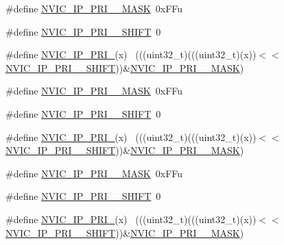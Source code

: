 \begin{DoxyCompactItemize}
\item 
\#define \hyperlink{group___n_v_i_c___register___masks_gad9d53a724bb3444439b236ad42d98266}{N\+V\+I\+C\+\_\+\+I\+P\+\_\+\+P\+R\+I\+\_\+\_\+\+M\+A\+SK}~0x\+F\+Fu
\item 
\#define \hyperlink{group___n_v_i_c___register___masks_ga06c5d2803f46b7145c7369ad34ce864b}{N\+V\+I\+C\+\_\+\+I\+P\+\_\+\+P\+R\+I\+\_\+\_\+\+S\+H\+I\+FT}~0
\item 
\#define \hyperlink{group___n_v_i_c___register___masks_ga2b7f135f6f5ab3e8557131145b390786}{N\+V\+I\+C\+\_\+\+I\+P\+\_\+\+P\+R\+I\+\_}(x)                                              ~(((uint32\+\_\+t)(((uint32\+\_\+t)(x))$<$$<$\hyperlink{group___n_v_i_c___register___masks_ga06c5d2803f46b7145c7369ad34ce864b}{N\+V\+I\+C\+\_\+\+I\+P\+\_\+\+P\+R\+I\+\_\+\_\+\+S\+H\+I\+FT}))\&\hyperlink{group___n_v_i_c___register___masks_gad9d53a724bb3444439b236ad42d98266}{N\+V\+I\+C\+\_\+\+I\+P\+\_\+\+P\+R\+I\+\_\+\_\+\+M\+A\+SK})
\item 
\#define \hyperlink{group___n_v_i_c___register___masks_gab2866da6e20a3704e6a7bf5c044414db}{N\+V\+I\+C\+\_\+\+I\+P\+\_\+\+P\+R\+I\+\_\+\_\+\+M\+A\+SK}~0x\+F\+Fu
\item 
\#define \hyperlink{group___n_v_i_c___register___masks_ga8c12a02af6fcba3c5a923613aaf0cac9}{N\+V\+I\+C\+\_\+\+I\+P\+\_\+\+P\+R\+I\+\_\+\_\+\+S\+H\+I\+FT}~0
\item 
\#define \hyperlink{group___n_v_i_c___register___masks_ga4d17554d3610422f9bd6a5a56d1a9bf4}{N\+V\+I\+C\+\_\+\+I\+P\+\_\+\+P\+R\+I\+\_}(x)                                            ~(((uint32\+\_\+t)(((uint32\+\_\+t)(x))$<$$<$\hyperlink{group___n_v_i_c___register___masks_ga8c12a02af6fcba3c5a923613aaf0cac9}{N\+V\+I\+C\+\_\+\+I\+P\+\_\+\+P\+R\+I\+\_\+\_\+\+S\+H\+I\+FT}))\&\hyperlink{group___n_v_i_c___register___masks_gab2866da6e20a3704e6a7bf5c044414db}{N\+V\+I\+C\+\_\+\+I\+P\+\_\+\+P\+R\+I\+\_\+\_\+\+M\+A\+SK})
\item 
\#define \hyperlink{group___n_v_i_c___register___masks_ga51ce88956f81659d9a1adb5bc13f2775}{N\+V\+I\+C\+\_\+\+I\+P\+\_\+\+P\+R\+I\+\_\+\_\+\+M\+A\+SK}~0x\+F\+Fu
\item 
\#define \hyperlink{group___n_v_i_c___register___masks_gac11a0fc7986b861dd44c4d4d3cdc2b50}{N\+V\+I\+C\+\_\+\+I\+P\+\_\+\+P\+R\+I\+\_\+\_\+\+S\+H\+I\+FT}~0
\item 
\#define \hyperlink{group___n_v_i_c___register___masks_ga6d770200ee4df3e0605fa7036cc4b424}{N\+V\+I\+C\+\_\+\+I\+P\+\_\+\+P\+R\+I\+\_}(x)                                            ~(((uint32\+\_\+t)(((uint32\+\_\+t)(x))$<$$<$\hyperlink{group___n_v_i_c___register___masks_gac11a0fc7986b861dd44c4d4d3cdc2b50}{N\+V\+I\+C\+\_\+\+I\+P\+\_\+\+P\+R\+I\+\_\+\_\+\+S\+H\+I\+FT}))\&\hyperlink{group___n_v_i_c___register___masks_ga51ce88956f81659d9a1adb5bc13f2775}{N\+V\+I\+C\+\_\+\+I\+P\+\_\+\+P\+R\+I\+\_\+\_\+\+M\+A\+SK})
$$
\end{DoxyCompactItemize}
